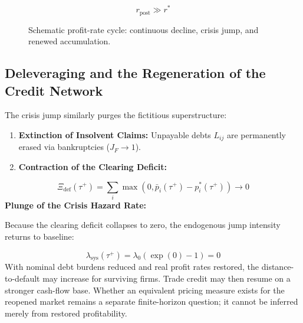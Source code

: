 \documentclass[11pt,letterpaper]{report}
\begin{document}
\[
{r}_{\mathrm{post}}\gg {r}^{*}
\]

\begin{figure}[H]\centering
{}
\caption{Schematic profit-rate cycle: continuous decline, crisis jump, and renewed accumulation.}
\end{figure}
\subsection{Deleveraging and the Regeneration of the Credit Network}
The crisis jump similarly purges the fictitious superstructure:

\begin{enumerate}
\item \textbf{Extinction of Insolvent Claims:} Unpayable debts ${L}_{ij}$ are permanently erased via bankruptcies (${J}_{F}\rightarrow 1$).
\item \textbf{Contraction of the Clearing Deficit:}
\end{enumerate}
\[
{\Xi }_{\mathrm{def}}({\tau }^{+})=\sum_{i}\max\left({0,{\bar{p}}_{i}({\tau }^{+})-{p}_{i}^{*}({\tau }^{+})}\right)\rightarrow 0
\]
\textbf{Plunge of the Crisis Hazard Rate:}

Because the clearing deficit collapses to zero, the endogenous jump intensity returns to baseline:

\[
{\lambda }_{\mathrm{sys}}({\tau }^{+})={\lambda }_{0}\left({\exp (0)-1}\right)=0
\]
With nominal debt burdens reduced and real profit rates restored, the distance-to-default may increase for surviving firms. Trade credit may then resume on a stronger cash-flow base. Whether an equivalent pricing measure exists for the reopened market remains a separate finite-horizon question; it cannot be inferred merely from restored profitability.
\end{document}
